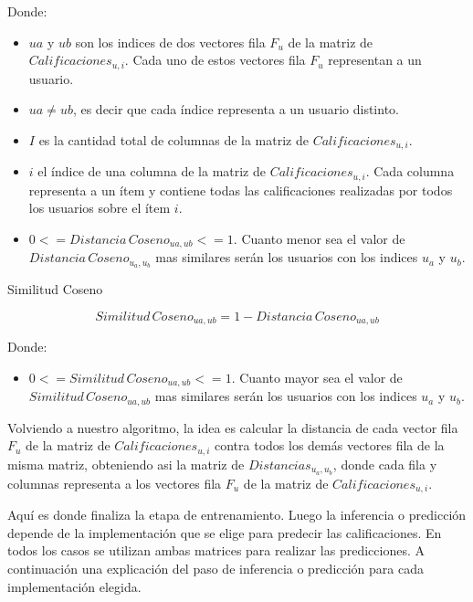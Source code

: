 \documentclass[11pt,a4paper,twoside]{thesis}
\begin{document}
\begin{description}
	\item[Donde:]
\end{description}
\begin{itemize}
	\item $ua$ y $ub$ son los indices de dos vectores fila $F_u$ de la matriz de $Calificaciones_{u,i}$. Cada uno de estos vectores fila $F_u$ representan a un usuario.
	\item $ua \neq ub$, es decir que cada índice representa a un usuario distinto.
	\item $I$ es la cantidad total de columnas de la matriz de $Calificaciones_{u,i}$.
	\item $i$ el índice de una columna de la matriz de $Calificaciones_{u,i}$. Cada columna representa a un ítem y contiene todas las calificaciones realizadas por todos los usuarios sobre el ítem $i$.
	\item $0 <= Distancia \mspace{3mu} Coseno_{ua, ub} <= 1$. Cuanto menor sea el valor de $Distancia \mspace{3mu} Coseno_{u_a, u_b}$ mas similares serán los usuarios con los indices $u_a$ y $u_b$.
\end{itemize}

\clearpage
\begin{description}
	\item[Similitud Coseno]
\end{description}
\begin{equation}
	Similitud \mspace{3mu}Coseno_{ua, ub} = 1- Distancia \mspace{3mu}Coseno_{ua, ub}
\end{equation}
\begin{description}
	\item[Donde:]
\end{description}
\begin{itemize}
	\item $0 <= Similitud \mspace{3mu}Coseno_{ua, ub} <= 1$. Cuanto mayor sea el valor de $Similitud \mspace{3mu}Coseno_{ua, ub}$ mas similares serán los usuarios con los indices $u_a$ y $u_b$.
\end{itemize}

Volviendo a nuestro algoritmo, la idea es calcular la distancia de cada vector
fila $F_u$ de la matriz de $Calificaciones_{u,i}$ contra todos los demás
vectores fila de la misma matriz, obteniendo asi la matriz de
$Distancias_{u_a,u_b}$, donde cada fila y columnas representa a los vectores
fila $F_u$ de la matriz de $Calificaciones_{u,i}$.

Aquí es donde finaliza la etapa de entrenamiento. Luego la inferencia o
predicción depende de la implementación que se elige para predecir las
calificaciones. En todos los casos se utilizan ambas matrices para realizar las
predicciones. A continuación una explicación del paso de inferencia o
predicción para cada implementación elegida.
\end{document}

